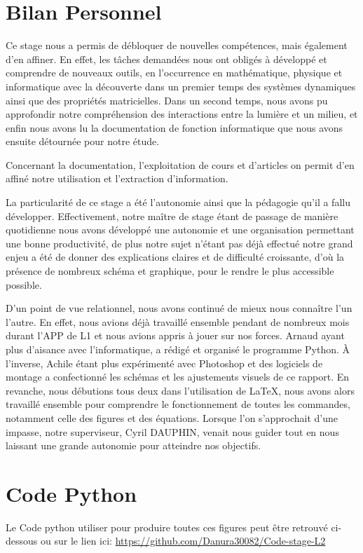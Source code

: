 \documentclass[12pt]{article}
\begin{document}
\newpage


\appendix
\section{Bilan Personnel}
Ce stage nous a permis de débloquer de nouvelles compétences, mais également d’en affiner. En effet,
les tâches demandées nous ont obligés à développé et comprendre de nouveaux outils, en l’occurrence en mathématique, physique et informatique avec la découverte dans un premier temps des systèmes dynamiques ainsi que des propriétés matricielles. Dans un second temps, nous avons pu approfondir notre compréhension des interactions entre la lumière et un milieu, et enfin nous avons lu la documentation de fonction informatique que nous avons ensuite détournée pour notre étude.\par
Concernant la documentation, l'exploitation de cours et d'articles on permit d'en affiné notre utilisation et l’extraction d'information.\par
La particularité de ce stage a été l'autonomie ainsi que la pédagogie qu'il a fallu développer. Effectivement, notre maître de stage étant de passage de manière quotidienne nous avons développé une autonomie et une organisation permettant une bonne productivité, de plus notre sujet n'étant pas déjà effectué notre grand enjeu a été de donner des explications claires et de difficulté croissante, d'où la présence de nombreux schéma et graphique, pour le rendre le plus accessible possible.\par
D’un point de vue relationnel, nous avons continué de mieux nous connaître l’un l’autre. En effet, nous avions déjà travaillé ensemble pendant de nombreux mois durant l’APP de L1 et nous avions appris à jouer sur nos forces. Arnaud ayant plus d’aisance avec l’informatique, a rédigé et organisé le programme Python. À l’inverse, Achile étant plus expérimenté avec Photoshop et des logiciels de montage a confectionné les schémas et les ajustements visuels de ce rapport. En revanche, nous débutions tous deux dans l’utilisation de LaTeX, nous avons alors travaillé ensemble pour comprendre le fonctionnement de toutes les commandes, notamment celle des figures et des équations. Lorsque l’on s’approchait d’une impasse, notre superviseur, Cyril DAUPHIN,
venait nous guider tout en nous laissant une grande autonomie pour atteindre nos objectifs. 
\section{Code Python}
Le Code python utiliser pour produire toutes ces figures peut être retrouvé ci-dessous ou sur le lien ici: \url{https://github.com/Danura30082/Code-stage-L2}
\inputminted[baselinestretch=1.2,
fontsize=\footnotesize,
linenos, breaklines]{Python}{V8.py}
\end{document}
